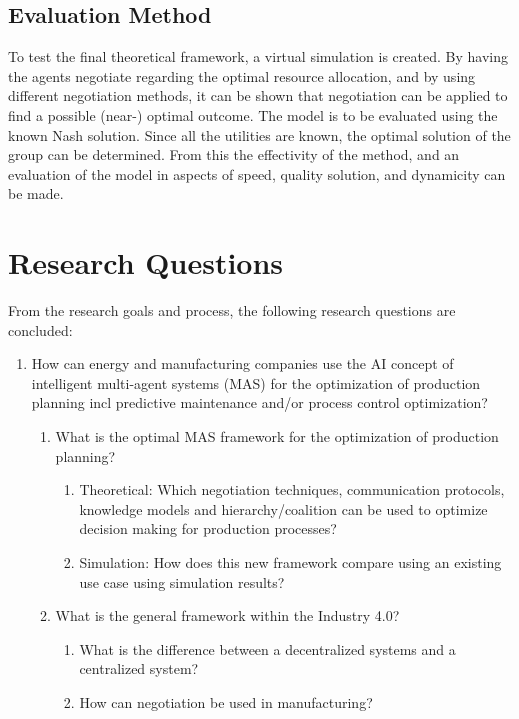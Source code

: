 \subsection{Evaluation Method}
To test the final theoretical framework, a virtual simulation is created. By having the agents negotiate regarding the optimal resource allocation, and by using different negotiation methods, it can be shown that negotiation can be applied to find a possible (near-) optimal outcome. The model is to be evaluated using the known Nash solution. Since all the utilities are known, the optimal solution of the group can be determined. From this the effectivity of the method, and an evaluation of the model in aspects of speed, quality solution, and dynamicity can be made.

\section{Research Questions}
From the research goals and process, the following research questions are concluded:
\begin{enumerate}
	\item
	How can energy and manufacturing companies use the AI concept of intelligent multi-agent systems (MAS) for the optimization of production planning incl predictive maintenance and/or process control optimization?
	\begin{enumerate}
		\item
		What is the optimal MAS framework for the optimization of production planning?
		\begin{enumerate}
			\item 
			Theoretical: Which negotiation techniques, communication protocols, knowledge models and hierarchy/coalition can be used to optimize decision making for production processes?
			\item
			Simulation: How does this new framework compare using an existing use case using simulation results?
		\end{enumerate}
		\item
		What is the general framework within the Industry 4.0?
		\begin{enumerate}
			\item 
			What is the difference between a decentralized systems and a centralized system?
			\item
			How can negotiation be used in manufacturing?
		\end{enumerate}
	\end{enumerate}
\end{enumerate}

